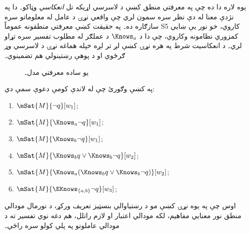 \documentclass[../../../include/open-logic-section]{subfiles}
\begin{document}
يوه لاره دا ده چې په معرفتي منطق کښې د لاسرسي اړيکه تل
\emph{انعکاسي} وټاکو۔ دا په نژدې معنا له دې نظر سره سمون لري چې
واقعي نړۍ د عامل له معلوماتو سره سازګاره ده۔ په حقيقت کښې معرفتي
منطقونه عموماً S5 کاروي، خو نور يې ښايي کمزوري نظامونه وکاروي،
چې دا د $\Knows_a$ د عملګر له مطلوب تفسير سره تړاو لري۔ د
انعکاسيت شرط په هره نړۍ کښې لږ تر لږه خپله هماغه نړۍ د لاسرسي
وړ ګرځوي او د پوهې رښتينولي هم تضمينوي۔

\begin{figure}
  \begin{center}
  \end{center}
  \caption{يو ساده معرفتي مدل۔}
\end{figure}

\begin{prob}
  په  کښې وګورئ چې له لاندې کومې
  دعوې سمې دي:
  \begin{enumerate}
    \item $\mSat{M}{\lnot q}[w_1]$;
    \item $\mSat{M}{\Knows_a \lnot q}[w_1]$;
    \item $\mSat{M}{\Knows_b \lnot q}[w_1]$;
    \item $\mSat{M}{\Knows_b q \lor \Knows_b \lnot q}[w_2]$;
    \item $\mSat{M}{\Knows_a( \Knows_b q \lor \Knows_b \lnot q)}[w_2]$;
    \item $\mSat{M}{\EKnows_{\{a,b\}} \lnot q}[w_3]$;
    \end{enumerate}
\end{prob}

اوس چې په يوه نړۍ کښې مو د رښتياوالي بنسټيز تعريف ورکړ، د نورمال
مودالي منطق نور معنايي مفاهيم، لکه مودالي اعتبار او لازم راتلل، هم
دغه نوي تفسير ته د مودالي عاملونو په پلي کولو سره راځي۔
\end{document}
